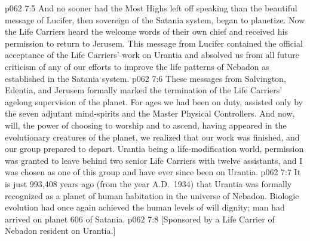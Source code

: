\vs p062 7:5 And no sooner had the Most Highs left off speaking than the beautiful message of Lucifer, then sovereign of the Satania system, began to planetize. Now the Life Carriers heard the welcome words of their own chief and received his permission to return to Jerusem. This message from Lucifer contained the official acceptance of the Life Carriers’ work on Urantia and absolved us from all future criticism of any of our efforts to improve the life patterns of Nebadon as established in the Satania system.
\vs p062 7:6 These messages from Salvington, Edentia, and Jerusem formally marked the termination of the Life Carriers’ agelong supervision of the planet. For ages we had been on duty, assisted only by the seven adjutant mind\hyp{}spirits and the Master Physical Controllers. And now, will, the power of choosing to worship and to ascend, having appeared in the evolutionary creatures of the planet, we realized that our work was finished, and our group prepared to depart. Urantia being a life\hyp{}modification world, permission was granted to leave behind two senior Life Carriers with twelve assistants, and I was chosen as one of this group and have ever since been on Urantia.
\vs p062 7:7 It is just 993,408 years ago (from the year A.D.~1934) that Urantia was formally recognized as a planet of human habitation in the universe of Nebadon. Biologic evolution had once again achieved the human levels of will dignity; man had arrived on planet 606 of Satania.
\vsetoff
\vs p062 7:8 [Sponsored by a Life Carrier of Nebadon resident on Urantia.]
